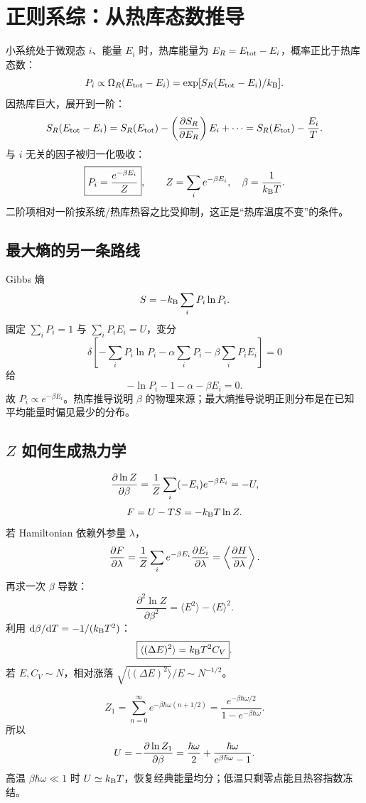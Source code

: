 \section{正则系综：从热库态数推导}
小系统处于微观态 $i$、能量 $E_i$ 时，热库能量为
$E_R=E_{\rm tot}-E_i$，概率正比于热库态数：
\[
P_i\propto\Omega_R(E_{\rm tot}-E_i)
=\exp[S_R(E_{\rm tot}-E_i)/k_{\mathrm B}].
\]
因热库巨大，展开到一阶：
\[
S_R(E_{\rm tot}-E_i)
=S_R(E_{\rm tot})
-\left(\frac{\partial S_R}{\partial E_R}\right)E_i+\cdots
=S_R(E_{\rm tot})-\frac{E_i}{T}.
\]
与 $i$ 无关的因子被归一化吸收：
\[
\boxed{P_i=\frac{e^{-\beta E_i}}Z},\qquad
Z=\sum_i e^{-\beta E_i},\quad\beta=\frac1{k_{\mathrm B} T}.
\]
二阶项相对一阶按系统/热库热容之比受抑制，这正是“热库温度不变”的条件。

\subsection{最大熵的另一条路线}
Gibbs 熵
\[
S=-k_{\mathrm B}\sum_iP_i\ln P_i.
\]
固定 $\sum_iP_i=1$ 与 $\sum_iP_iE_i=U$，变分
\[
\delta\left[-\sum_iP_i\ln P_i
-\alpha\sum_iP_i-\beta\sum_iP_iE_i\right]=0
\]
给
\[
-\ln P_i-1-\alpha-\beta E_i=0.
\]
故 $P_i\propto e^{-\beta E_i}$。热库推导说明 $\beta$ 的物理来源；最大熵推导说明正则分布是在已知平均能量时偏见最少的分布。

\subsection{$Z$ 如何生成热力学}
\[
\frac{\partial \ln Z}{\partial \beta}
=\frac1Z\sum_i(-E_i)e^{-\beta E_i}=-U,
\]
\[
F=U-TS=-k_{\mathrm B} T\ln Z.
\]
若 Hamiltonian 依赖外参量 $\lambda$，
\[
\frac{\partial F}{\partial \lambda}
=\frac1Z\sum_i e^{-\beta E_i}\frac{\partial E_i}{\partial \lambda}
=\left\langle\frac{\partial H}{\partial \lambda}\right\rangle.
\]
再求一次 $\beta$ 导数：
\[
\frac{\partial^2\ln Z}{\partial\beta^2}
=\langle E^2\rangle-\langle E\rangle^2.
\]
利用 $\mathrm d\beta/\mathrm d T=-1/(k_{\mathrm B} T^2)$：
\[
\boxed{\langle(\Delta E)^2\rangle=k_{\mathrm B} T^2C_V}.
\]
若 $E,C_V\sim N$，相对涨落
$\sqrt{\langle(\Delta E)^2\rangle}/E\sim N^{-1/2}$。

\begin{examplebox}[title=量子谐振子的正则系综]
\[
Z_1=\sum_{n=0}^{\infty}e^{-\beta\hbar\omega(n+1/2)}
=\frac{e^{-\beta\hbar\omega/2}}{1-e^{-\beta\hbar\omega}}.
\]
所以
\[
U=-\frac{\partial \ln Z_1}{\partial \beta}
=\frac{\hbar\omega}{2}
+\frac{\hbar\omega}{e^{\beta\hbar\omega}-1}.
\]
高温 $\beta\hbar\omega\ll1$ 时 $U\simeq k_{\mathrm B} T$，恢复经典能量均分；低温只剩零点能且热容指数冻结。
\end{examplebox}

